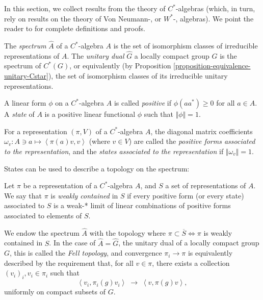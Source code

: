 In this section, we collect results from the theory of $C^*$-algebras (which, in turn, rely on results on the theory of Von Neumann-, or $W^*$-, algebras). We point the reader to \cite{Dixmier-Cstar} for complete definitions and proofs. 


\noindent
\begin{definition}
\label{definition-spectrum}
The {\it spectrum} $\hat A$ of a $C^*$-algebra $A$ is the set of isomorphism classes of irreducible representations of $A$. The {\it unitary dual} $\hat G$ a locally compact group $G$ is the spectrum of $C^*(G)$, or equivalently (by Proposition \ref{proposition-equivalence-unitary-Cstar}), the set of isomorphism classes of its irreducible unitary representations.
\end{definition}

\begin{definition}
 \label{definition-state}
A linear form $\phi$ on a $C^*$-algebra $A$ is called {\it positive} if $\phi(aa^*)\geq 0$ for all $a\in A$. A {\it state} of $A$ is a positive linear functional $\phi$ such that $\Vert \phi\Vert =1$.

For a representation $(\pi, V)$ of a $C^*$-algebra $A$, the diagonal matrix coefficients $\omega_v:A\ni a\mapsto \left <\pi(a) v, v\right>$ (where $v\in V$) are called the {\it positive forms associated to the representation}, and the {\it states associated to the representation} if $\Vert \omega_v\Vert =1$.
\end{definition}



States can be used to describe a topology on the spectrum:

\begin{definition}
\label{definition-Fell-topology}
Let $\pi$ be a representation of a $C^*$-algebra $A$, and $S$ a set of representations of $A$. We say that $\pi$ is {\it weakly contained} in $S$ if every positive form (or every state) associated to $S$ is a weak-* limit of linear combinations of positive forms associated to elements of $S$. 

We endow the spectrum $\hat A$ with the topology where $\pi \subset \overline{S} \iff \pi$ is weakly contained in $S$. In the case of $\hat A = \hat G$, the unitary dual of a locally compact group $G$, this is called the {\it Fell topology}, and convergence $\pi_i \to \pi$  is equivalently described by the requirement that, for all $v\in \pi$, there exists a collection $(v_i)_i, v_i\in\pi_i$ such that
\[\left <v_i,\pi_i(g)v_i\right >\;\to\; \left <v,\pi(g)v\right >,\]
uniformly on compact subsets of $G$. 
\end{definition}

